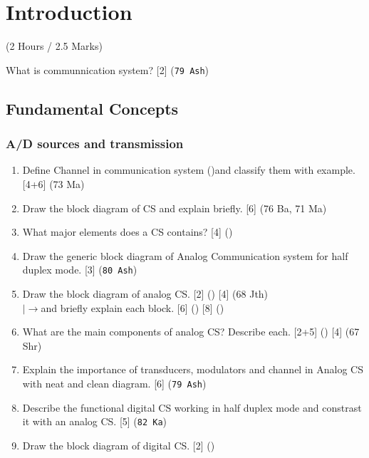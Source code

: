 \documentclass[12pt]{article}
\newcommand{\lb}{\\$\left|\rightarrow\right.$}
\begin{document}
\section{Introduction}
  \begin{center}(2 Hours / 2.5 Marks)\end{center}

  What is communnication system? \hfill [2] (\texttt{79 Ash})

  \subsection{Fundamental Concepts}
    \subsubsection{A/D sources and transmission}
      \begin{enumerate}[topsep=0pt, noitemsep]
        \item Define Channel in communication system ()and classify them with example. \hfill [4+6] (73 Ma)

        \item Draw the block diagram of CS and explain briefly. \hfill [6] (76 Ba, 71 Ma)

        \item What major elements does a CS contains? \hfill [4] ()

        \item Draw the generic block diagram of Analog Communication system for half duplex mode. \hfill [3] (\texttt{80 Ash})

        \item Draw the block diagram of analog CS. \hfill [2] () [4] (68 Jth)
        \lb and briefly explain each block. \hfill [6] () [8] ()

        \item What are the main components of analog CS? Describe each. \hfill [2+5] () [4] (67 Shr)

        \item Explain the importance of transducers, modulators and channel in Analog CS with neat and clean diagram. \hfill [6] (\texttt{79 Ash})

        \item Describe the functional digital CS working in half duplex mode and constrast it with an analog CS. \hfill [5] (\texttt{82 Ka})

        \item Draw the block diagram of digital CS. \hfill [2] ()
        

\end{enumerate}
\end{document}
